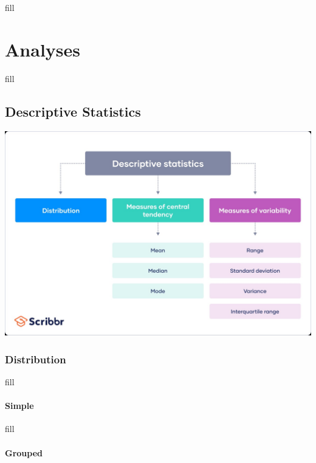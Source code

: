 \documentclass[
  b5paper]{book}
\begin{document}
fill

\hypertarget{analyses-1}{%
\chapter{Analyses}\label{analyses-1}}

fill

\hypertarget{descriptive-statistics-1}{%
\section{Descriptive Statistics}\label{descriptive-statistics-1}}

\href{Descriptive\%20Stats\%20Graphic}{\includegraphics[width=1\textwidth,height=\textheight]{images/desc_stats.jpg}}

\hypertarget{distribution-1}{%
\subsection*{Distribution}\label{distribution-1}}

fill

\hypertarget{simple}{%
\subsubsection*{Simple}\label{simple}}

fill

\hypertarget{grouped}{%
\subsubsection*{Grouped}\label{grouped}}
\end{document}
